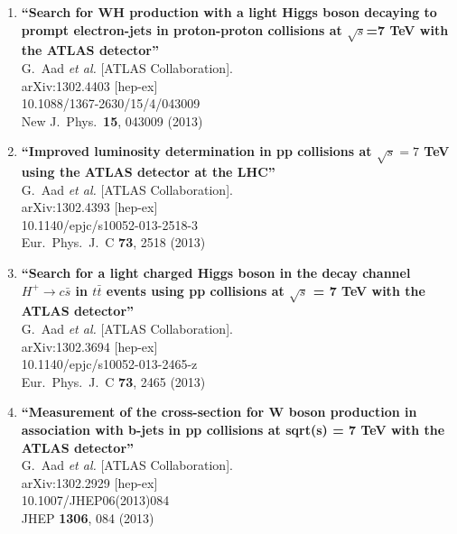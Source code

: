 \documentclass{article}
\begin{document}
\begin{enumerate}
\item%
{\bf ``Search for WH production with a light Higgs boson decaying to prompt electron-jets in proton-proton collisions at $\sqrt{s}$=7 TeV with the ATLAS detector''}
  \\{}G.~Aad {\it et al.}  [ATLAS Collaboration].
  \\{}arXiv:1302.4403 [hep-ex]
    \\{}10.1088/1367-2630/15/4/043009
\\{}New J.\ Phys.\  {\bf 15}, 043009 (2013) %


\item%
{\bf ``Improved luminosity determination in pp collisions at $\sqrt{s} = 7$ TeV using the ATLAS detector at the LHC''}
  \\{}G.~Aad {\it et al.}  [ATLAS Collaboration].
  \\{}arXiv:1302.4393 [hep-ex]
    \\{}10.1140/epjc/s10052-013-2518-3
\\{}Eur.\ Phys.\ J.\ C {\bf 73}, 2518 (2013) %


\item%
{\bf ``Search for a light charged Higgs boson in the decay channel $H^+ \to c\bar{s}$ in $t\bar{t}$ events using pp collisions at $\sqrt{s}$ = 7 TeV with the ATLAS detector''}
  \\{}G.~Aad {\it et al.}  [ATLAS Collaboration].
  \\{}arXiv:1302.3694 [hep-ex]
    \\{}10.1140/epjc/s10052-013-2465-z
\\{}Eur.\ Phys.\ J.\ C {\bf 73}, 2465 (2013) %


\item%
{\bf ``Measurement of the cross-section for W boson production in association with b-jets in pp collisions at sqrt(s) = 7 TeV with the ATLAS detector''}
  \\{}G.~Aad {\it et al.}  [ATLAS Collaboration].
  \\{}arXiv:1302.2929 [hep-ex]
    \\{}10.1007/JHEP06(2013)084
\\{}JHEP {\bf 1306}, 084 (2013) %



\end{enumerate}
\end{document}

